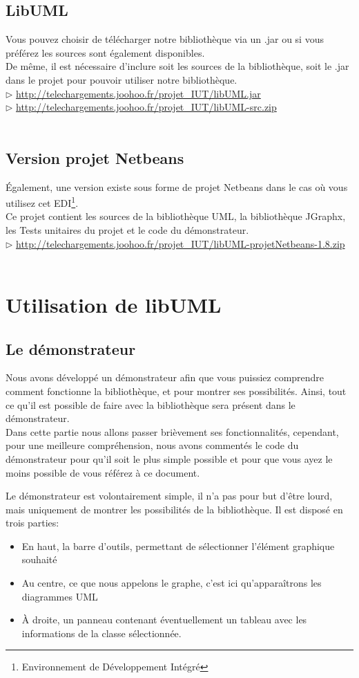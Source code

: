\documentclass[12pt,a4paper,openany]{report}
\begin{document}
	\section{LibUML}
	Vous pouvez choisir de télécharger notre bibliothèque via un .jar ou si vous préférez les sources sont également disponibles.\\
	De même, il est nécessaire d'inclure soit les sources de la bibliothèque, soit le .jar dans le projet pour pouvoir utiliser notre bibliothèque.\\
	$\rhd$ \url{http://telechargements.joohoo.fr/projet\_IUT/libUML.jar}\\
	$\rhd$ \url{http://telechargements.joohoo.fr/projet\_IUT/libUML-src.zip}\\\\
	\section{Version projet Netbeans}
	Également, une version existe sous forme de projet Netbeans dans le cas où vous utilisez cet EDI\footnote{Environnement de Développement Intégré}.\\
	Ce projet contient les sources de la bibliothèque UML, la bibliothèque JGraphx, les Tests unitaires du projet et le code du démonstrateur.\\
	$\rhd$ \url{http://telechargements.joohoo.fr/projet\_IUT/libUML-projetNetbeans-1.8.zip}\\\\
	\chapter{Utilisation de libUML}
	\section{Le démonstrateur}
	Nous avons développé un démonstrateur afin que vous puissiez comprendre comment fonctionne la bibliothèque, et pour montrer ses possibilités.
	Ainsi, tout ce qu'il est possible de faire avec la bibliothèque sera présent dans le démonstrateur.\\
	Dans cette partie nous allons passer brièvement ses fonctionnalités, cependant, pour une meilleure
	compréhension, nous avons commentés le code du démonstrateur pour qu'il soit le plus simple possible et pour que vous ayez le moins 
	possible de vous référez à ce document. 
	
	Le démonstrateur est volontairement simple, il n'a pas pour but d'être lourd, mais uniquement de montrer les possibilités de la bibliothèque. 
	Il est disposé en trois parties:
	\begin{itemize}
		\item En haut, la barre d'outils, permettant de sélectionner l'élément graphique souhaité
		\item Au centre, ce que nous appelons le graphe, c'est ici qu'apparaîtrons les diagrammes UML
		\item À droite, un panneau contenant éventuellement un tableau avec les informations de la classe sélectionnée.
	\end{itemize}
\end{document}

